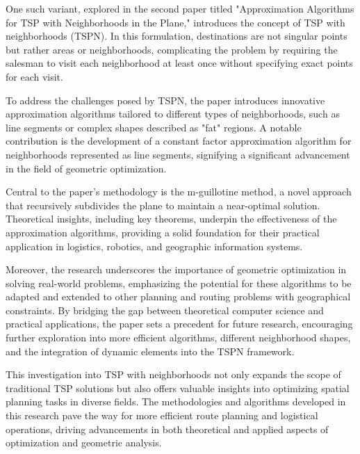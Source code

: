 \vspace*{6mm}

One such variant, explored in the second paper titled "Approximation Algorithms for TSP with Neighborhoods in the Plane," introduces the concept of TSP with neighborhoods (TSPN). In this formulation, destinations are not singular points but rather areas or neighborhoods, complicating the problem by requiring the salesman to visit each neighborhood at least once without specifying exact points for each visit.

\vspace*{6mm}

To address the challenges posed by TSPN, the paper introduces innovative approximation algorithms tailored to different types of neighborhoods, such as line segments or complex shapes described as "fat" regions. A notable contribution is the development of a constant factor approximation algorithm for neighborhoods represented as line segments, signifying a significant advancement in the field of geometric optimization.

\vspace*{6mm}

Central to the paper's methodology is the m-guillotine method, a novel approach that recursively subdivides the plane to maintain a near-optimal solution. Theoretical insights, including key theorems, underpin the effectiveness of the approximation algorithms, providing a solid foundation for their practical application in logistics, robotics, and geographic information systems.

\vspace*{6mm}

Moreover, the research underscores the importance of geometric optimization in solving real-world problems, emphasizing the potential for these algorithms to be adapted and extended to other planning and routing problems with geographical constraints. By bridging the gap between theoretical computer science and practical applications, the paper sets a precedent for future research, encouraging further exploration into more efficient algorithms, different neighborhood shapes, and the integration of dynamic elements into the TSPN framework.

\vspace*{6mm}

This investigation into TSP with neighborhoods not only expands the scope of traditional TSP solutions but also offers valuable insights into optimizing spatial planning tasks in diverse fields. The methodologies and algorithms developed in this research pave the way for more efficient route planning and logistical operations, driving advancements in both theoretical and applied aspects of optimization and geometric analysis.

